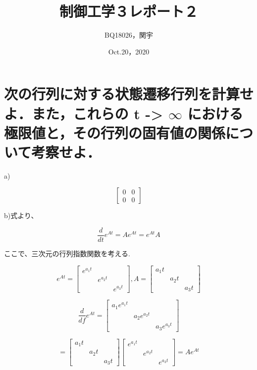 \documentclass[xelatex,ja=standard,jafont=noto]{bxjsarticle}
\title{制御工学３レポート２	}
\author{BQ18026，関宇 }
\date{Oct.20，2020}
\begin{document}
		\maketitle
		
		
		
	\section{次の行列に対する状態遷移行列を計算せよ．また，これらの t -> $\infty$ における
極限値と，その行列の固有値の関係について考察せよ．}

a)

\begin{equation}
    {
    \left[
    \begin{array}{cc}
        0 & 0 \\
        0 & 0
    \end{array}
    \right]
    }
\end{equation}
	
	b)式より、
	
	\begin{equation}
	    \frac{d}{dt}e^{At}=Ae^{At}=e^{At}A
	\end{equation}
	
	ここで、三次元の行列指数関数を考える.
	
	\begin{equation}
	    e^{At}={
\left[ \begin{array}{ccc}
e^{a_{1}t}&&\\
&e^{a_{2}t}&\\
&&e^{a_{3}t}
\end{array}
\right ]},A={
\left[ \begin{array}{ccc}
a_{1}t&&\\
&a_{2}t&\\
&&a_{3}t
\end{array}
\right ]}
	\end{equation}
	
	
	\begin{equation}
	    \frac{d}{df}e^{At}={
\left[ \begin{array}{ccc}
a_{1}e^{a_{1}t}&&\\
&a_{2}e^{a_{2}t}&\\
&&a_{3}e^{a_{3}t}
\end{array}
\right ]}
	\end{equation}
	
	\begin{equation}
	    ={
\left[ \begin{array}{ccc}
a_{1}t&&\\
&a_{2}t&\\
&&a_{3}t
\end{array}
\right ]}{
\left[ \begin{array}{ccc}
e^{a_{1}t}&&\\
&e^{a_{2}t}&\\
&&e^{a_{3}t}
\end{array}
\right ]}=Ae^{At}
	\end{equation}
	
\end{document}
